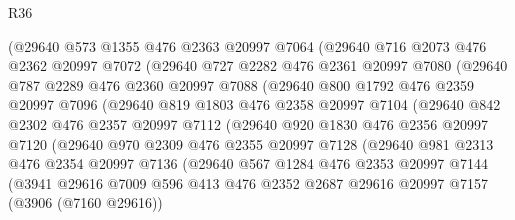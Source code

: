 \begin{lexlean}{R36}
\begin{coremodule}
          (@29640
            @573
            @1355
            @476
            @2363
            @20997
            @7064
            (@29640
              @716
              @2073
              @476
              @2362
              @20997
              @7072
              (@29640
                @727
                @2282
                @476
                @2361
                @20997
                @7080
                (@29640
                  @787
                  @2289
                  @476
                  @2360
                  @20997
                  @7088
                  (@29640
                    @800
                    @1792
                    @476
                    @2359
                    @20997
                    @7096
                    (@29640
                      @819
                      @1803
                      @476
                      @2358
                      @20997
                      @7104
                      (@29640
                        @842
                        @2302
                        @476
                        @2357
                        @20997
                        @7112
                        (@29640
                          @920
                          @1830
                          @476
                          @2356
                          @20997
                          @7120
                          (@29640
                            @970
                            @2309
                            @476
                            @2355
                            @20997
                            @7128
                            (@29640
                              @981
                              @2313
                              @476
                              @2354
                              @20997
                              @7136
                              (@29640
                                @567
                                @1284
                                @476
                                @2353
                                @20997
                                @7144
                                (@3941
                                  @29616
                                  @7009
                                  @596
                                  @413
                                  @476
                                  @2352
                                  @2687
                                  @29616
                                  @20997
                                  @7157
                                  (@3906 (@7160 @29616))

\end{coremodule}
\end{lexlean}
